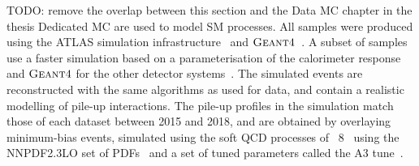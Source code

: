 \documentclass[letterpaper,12pt]{article}
\begin{document}


TODO: remove the overlap between this section and the Data MC chapter in the thesis
Dedicated MC are used to model SM processes. 
All samples were 
produced using the ATLAS simulation infrastructure~\cite{SOFT-2010-01}
and $\textsc{Geant}4$~\cite{Agostinelli:2002hh}. A subset of samples use a faster 
simulation based on a parameterisation of the calorimeter response and 
$\textsc{Geant}4$ for the other detector systems~\cite{SOFT-2010-01}. %
The simulated events are reconstructed with the same algorithms as
used for data, and contain a realistic modelling of pile-up
interactions. The pile-up profiles in the simulation match those of each dataset
between 2015 and 2018, and are obtained by overlaying minimum-bias events,
simulated using the soft QCD processes of
{\PYTHIA}~8~\cite{Sjostrand:2014zea} using the NNPDF2.3LO set of
PDFs~\cite{Ball:2012cx} and a set of tuned
parameters called the A3 tune~\cite{ATL-PHYS-PUB-2016-017}.
\end{document}

